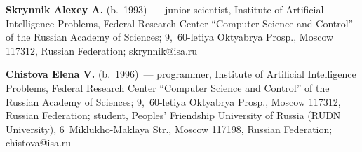   \vspace*{3pt}
  
  \noindent
  \textbf{Skrynnik Alexey A.} (b.\ 1993)~--- junior scientist, Institute of Artificial 
Intelligence Problems, Federal Research Center ``Computer Science and Control'' of 
the Russian Academy of Sciences; 9,~60-letiya Oktyabrya Prosp., Moscow 117312, 
Russian Federation; \mbox{skrynnik@isa.ru}
  
  \vspace*{3pt}
  
  
  
  
  \noindent
  \textbf{Chistova Elena V.} (b.\ 1996)~--- programmer, Institute of Artificial 
Intelligence Problems, Federal Research Center ``Computer Science and Control'' of 
the Russian Academy of Sciences; 9,~60-letiya Oktyabrya Prosp., Moscow 117312, 
Russian Federation; student, Peoples' Friendship University of Russia (RUDN 
University), 6~Miklukho-Maklaya Str., Moscow 117198, Russian Federation; 
\mbox{chistova@isa.ru}
\label{end\stat}

\renewcommand{\bibname}{\protect\rm Литература}  
  